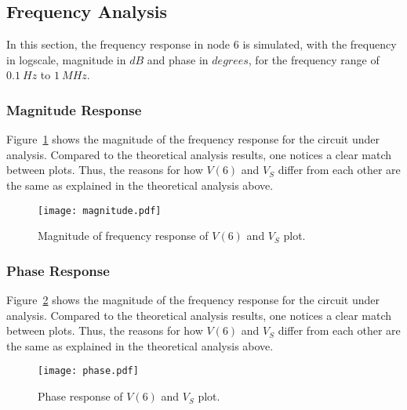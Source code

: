 \newpage

\subsection{Frequency Analysis}

In this section, the frequency response in node 6 is simulated, with the frequency in logscale, magnitude in $dB$ and phase in $degrees$, for the frequency range of $0.1~Hz$ to $1~MHz$.


\subsubsection{Magnitude Response}

Figure~\ref{fig:magsim} shows the magnitude of the frequency response for the circuit under analysis. Compared to the theoretical analysis results, one notices a clear match between plots. Thus, the reasons for how $V(6)$ and $V_S$ differ from each other are the same as explained in the theoretical analysis above.

\begin{figure}[h] \centering
\texttt{[image: magnitude.pdf]}
	\caption{Magnitude of frequency response of $V(6)$ and $V_S$ plot.}
\label{fig:magsim}
\end{figure}

\newpage

\subsubsection{Phase Response}

Figure~\ref{fig:phasesim} shows the magnitude of the frequency response for the circuit under analysis. Compared to the theoretical analysis results, one notices a clear match between plots. Thus, the reasons for how $V(6)$ and $V_S$ differ from each other are the same as explained in the theoretical analysis above.

\begin{figure}[h] \centering
\texttt{[image: phase.pdf]}
	\caption{Phase response of $V(6)$ and $V_S$ plot.}
\label{fig:phasesim}
\end{figure}


